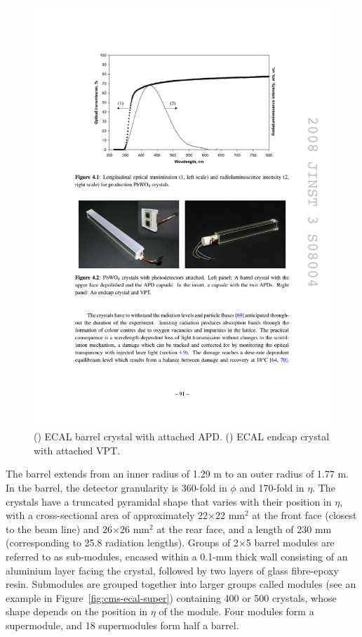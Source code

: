 \begin{figure}[hbtp]
  \begin{center}
    \includegraphics[width=2.5\cmsFigWidth]{figures/cms-ecal-crystals}
    \caption{(\cmsLeft) ECAL barrel crystal with attached APD. (\cmsRight) ECAL endcap crystal with attached VPT.~\cite{1748-0221-3-08-S08004}}
    \label{fig:cms-ecal-crystals}
  \end{center}
\end{figure}

The barrel extends from an inner radius of 1.29 m to an outer radius of 1.77 m. In the barrel, the detector granularity is 360-fold in $\phi$ and 170-fold in $\eta$. The crystals have a truncated pyramidal shape that varies with their position in $\eta$, with a cross-sectional area of approximately 22$\times$22 mm$^2$ at the front face (closest to the beam line) and 26$\times$26 mm$^2$ at the rear face, and a length of 230 mm (corresponding to 25.8 radiation lengths). Groups of 2$\times$5 barrel modules are referred to as sub-modules, encased within a 0.1-mm thick wall consisting of an aluminium layer facing the crystal, followed by two layers of glass fibre-epoxy resin. Submodules are grouped together into larger groups called modules (see an example in Figure~\ref{fig:cms-ecal-super}) containing 400 or 500 crystals, whose shape depends on the position in $\eta$ of the module. Four modules form a supermodule, and 18 supermodules form half a barrel.

